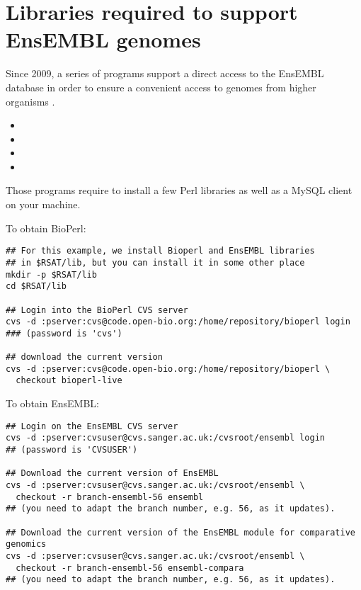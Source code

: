 \documentclass[12pt,a4paper, oneside]{scrreprt} %
\begin{document}


\section{Libraries required to support EnsEMBL genomes}

Since 2009, a series of \RSAT programs support a direct access to the
EnsEMBL database in order to ensure a convenient access to genomes
from higher organisms \cite{Sand:2009}.

\begin{itemize}
\item {}
\item {}
\item {} 
\item {}
\end{itemize}

Those programs require to install a few Perl libraries as well as a
MySQL client on your machine. 

To obtain BioPerl:

\begin{lstlisting}
## For this example, we install Bioperl and EnsEMBL libraries 
## in $RSAT/lib, but you can install it in some other place
mkdir -p $RSAT/lib
cd $RSAT/lib

## Login into the BioPerl CVS server
cvs -d :pserver:cvs@code.open-bio.org:/home/repository/bioperl login
### (password is 'cvs')

## download the current version
cvs -d :pserver:cvs@code.open-bio.org:/home/repository/bioperl \
  checkout bioperl-live

\end{lstlisting}


To obtain EnsEMBL:

\begin{lstlisting}
## Login on the EnsEMBL CVS server
cvs -d :pserver:cvsuser@cvs.sanger.ac.uk:/cvsroot/ensembl login
## (password is 'CVSUSER')

## Download the current version of EnsEMBL
cvs -d :pserver:cvsuser@cvs.sanger.ac.uk:/cvsroot/ensembl \
  checkout -r branch-ensembl-56 ensembl
## (you need to adapt the branch number, e.g. 56, as it updates).

## Download the current version of the EnsEMBL module for comparative genomics
cvs -d :pserver:cvsuser@cvs.sanger.ac.uk:/cvsroot/ensembl \
  checkout -r branch-ensembl-56 ensembl-compara
## (you need to adapt the branch number, e.g. 56, as it updates).
\end{lstlisting}
\end{document}
